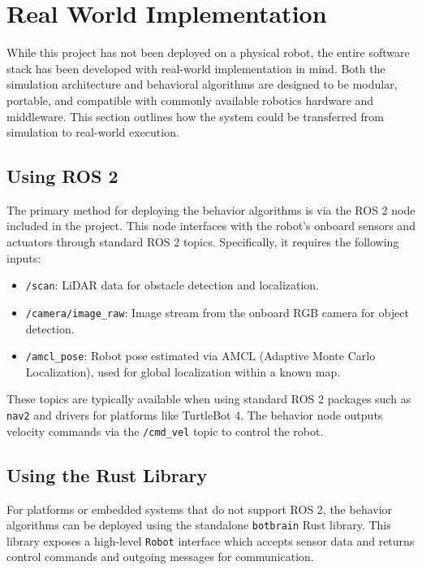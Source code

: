 \section{Real World Implementation}
While this project has not been deployed on a physical robot, the entire software stack has been developed with real-world implementation in mind. 
Both the simulation architecture and behavioral algorithms are designed to be modular, portable, and compatible with commonly available robotics hardware and middleware. 
This section outlines how the system could be transferred from simulation to real-world execution.

\subsection{Using ROS 2}
The primary method for deploying the behavior algorithms is via the ROS 2 node included in the project.
This node interfaces with the robot’s onboard sensors and actuators through standard ROS 2 topics.
Specifically, it requires the following inputs:

\begin{itemize}
  \item \texttt{/scan}: LiDAR data for obstacle detection and localization.
  \item \texttt{/camera/image\_raw}: Image stream from the onboard RGB camera for object detection.
  \item \texttt{/amcl\_pose}: Robot pose estimated via AMCL (Adaptive Monte Carlo Localization), used for global localization within a known map.
\end{itemize}

These topics are typically available when using standard ROS 2 packages such as \texttt{nav2} and drivers for platforms like TurtleBot 4.
The behavior node outputs velocity commands via the \texttt{/cmd\_vel} topic to control the robot.

\subsection{Using the Rust Library}
For platforms or embedded systems that do not support ROS 2, the behavior algorithms can be deployed using the standalone \texttt{botbrain} Rust library. 
This library exposes a high-level \texttt{Robot} interface which accepts sensor data and returns control commands and outgoing messages for communication.


